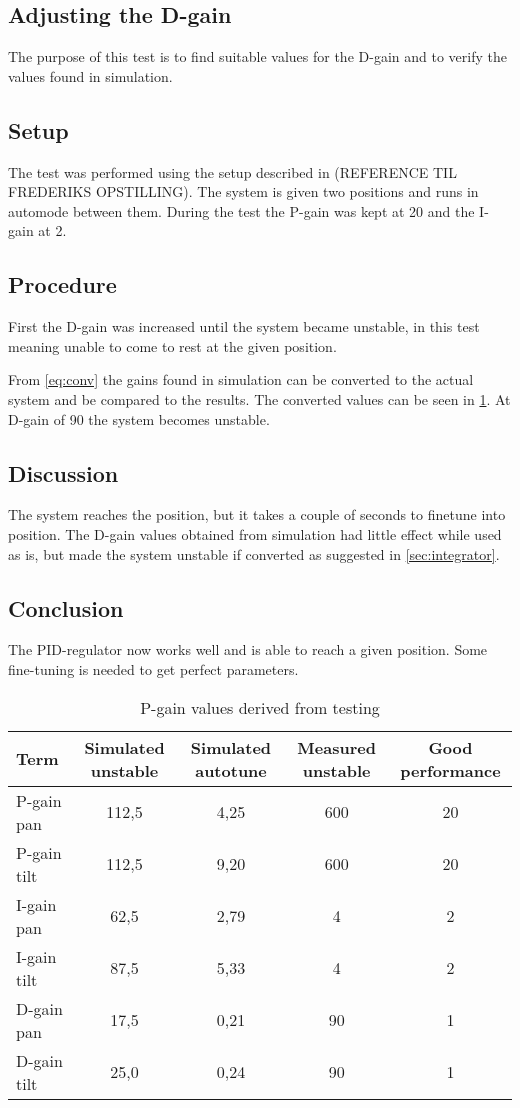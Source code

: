 \subsection{Adjusting the D-gain}\label{sec:pid_experiments_d}
The purpose of this test is to find suitable values for the D-gain and to verify the values found in simulation.

\subsection{Setup}
The test was performed using the setup described in (REFERENCE TIL FREDERIKS OPSTILLING). The system is given two positions and runs in automode between them. During the test the P-gain was kept at 20 and the I-gain at 2.

\subsection{Procedure}
First the D-gain was increased until the system became unstable, in this test meaning unable to come to rest at the given position. 

From \ref{eq:conv} the gains found in simulation can be converted to the actual system and be compared to the results. The converted values can be seen in \ref{tab:actual_gain_values}. At D-gain of 90 the system becomes unstable.

\subsection{Discussion}
The system reaches the position, but it takes a couple of seconds to finetune into position. The D-gain values obtained from simulation had little effect while used as is, but made the system unstable if converted as suggested in \ref{sec:integrator}.

\subsection{Conclusion}
The PID-regulator now works well and is able to reach a given position. Some fine-tuning is needed to get perfect parameters.

\begin{table}[htb]				
	\begin{center}
	\begin{tabular}{l|c|c|c|c}			
	Term & Simulated unstable & Simulated autotune & Measured unstable & Good performance  \\	\hline								P-gain pan & 112,5  & 4,25 & 600 & 20 \\
	P-gain tilt   & 112,5 & 9,20 & 600 & 20 \\
	I-gain pan & 62,5 & 2,79 & 4 & 2 \\
	I-gain tilt   & 87,5 & 5,33 & 4 & 2 \\
	D-gain pan & 17,5 & 0,21 & 90 & 1 \\
	D-gain tilt   & 25,0 & 0,24 & 90 & 1 \\
	\end{tabular}
	\end{center}
	\caption{P-gain values derived from testing}				
	\label{tab:actual_gain_values}			
\end{table}



